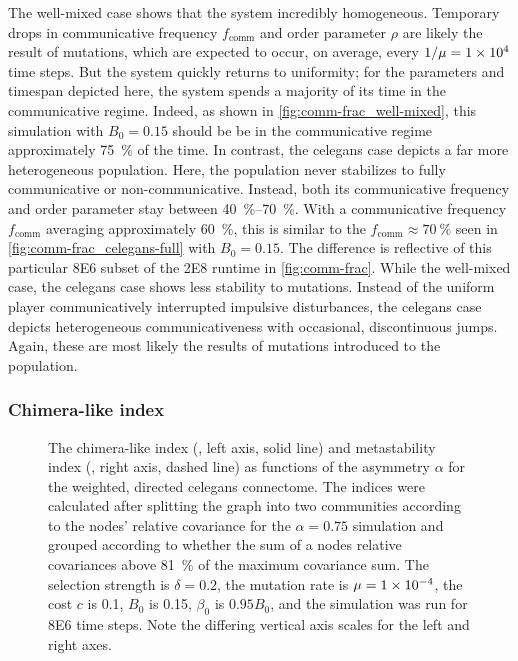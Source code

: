 \documentclass[pdflatex,lineno,referee,sn-mathphys-ay]{sn-jnl}
\begin{document}
The  well-mixed case
shows that the system incredibly homogeneous.
Temporary drops in communicative frequency $f_{\text{comm}}$
and order parameter $\rho$ are likely the result of mutations,
which are expected to occur, on average, every $1/\mu = \num{1E4}$ time steps.
But the system quickly returns to uniformity;
for the parameters and timespan depicted here,
the system spends a majority of its time in the communicative regime.
Indeed, as shown in \cref{fig:comm-frac_well-mixed},
this simulation with $B_0 = 0.15$ should be be in the communicative regime
approximately \SI{75}{\percent} of the time.
In contrast, the  \gls{celegans} case
depicts a far more heterogeneous population.
Here, the population never stabilizes to fully communicative or non-communicative.
Instead, both its communicative frequency and order parameter
stay between \SIrange{40}{70}{\percent}.
With a communicative frequency $f_{\text{comm}}$ averaging approximately \SI{60}{\percent},
this is similar to the $f_{\text{comm}} \approx \SI{70}{\percent}$ seen
in \cref{fig:comm-frac_celegans-full} with $B_0 = 0.15$.
The difference is reflective of this particular \num{8E6} subset
of the \num{2E8} runtime in \cref{fig:comm-frac}.
While the  well-mixed case,
the \gls{celegans} case shows less stability to mutations.
Instead of the uniform player communicatively interrupted
impulsive disturbances,
the \gls{celegans} case depicts heterogeneous communicativeness
with occasional, discontinuous jumps.
Again, these are most likely the results of mutations introduced
to the population.

\subsubsection{Chimera-like index}
\begin{figure}
  \centering
  \pgfplotsset{width=0.4\textwidth}
  
  \caption{
    The chimera-like index (, left axis, solid line)
    and metastability index (,
    right axis, dashed line)
    as functions of the asymmetry $\alpha$
    for the
    weighted, directed \gls{celegans} connectome.
    The indices were calculated after splitting the graph
    into two communities according to the nodes' relative covariance
    for the $\alpha = \num{0.75}$ simulation
    and grouped according to whether the sum
    of a nodes relative covariances above
    \SI{81}{\percent} of the maximum covariance sum.
    The selection strength is $\delta=0.2$,
    the mutation rate is $\mu=\num{1E-4}$,
    the cost $c$ is \num{0.1},
    $B_0$ is \num{0.15},
    $\beta_0$ is $\num{0.95} B_0$,
    and the simulation was run for \num{8E6} time steps.
    Note the differing vertical axis scales
    for the left and right axes.
  }
  \label{fig:chimera-index}
\end{figure}
\end{document}
